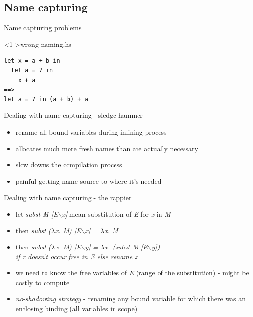 \documentclass[hyperref={pdfpagelabels=false},xcolor={dvipsnames},compress,table,usenames,dvipsnames]{beamer}
\begin{document}
    \subsection{Name capturing}

    \begin{frame}[fragile]{Name capturing problems}
        \begin{exampleblock}
            <1->{wrong-naming.hs}
            \begin{lstlisting}
let x = a + b in
  let a = 7 in
    x + a
==>
let a = 7 in (a + b) + a
            \end{lstlisting}
        \end{exampleblock}
    \end{frame}

    \begin{frame}[fragile]{Dealing with name capturing - sledge hammer}
        \begin{itemize}
            \item rename all bound variables during inlining process\pause
            \item allocates much more fresh names than are actually necessary\pause
            \item slow downs the compilation process\pause
            \item painful getting name source to where it's needed
        \end{itemize}
    \end{frame}

    \begin{frame}[fragile]{Dealing with name capturing - the rappier}
        \begin{itemize}
            \item let \textit{subst M [E$\backslash$x]} mean substitution of \textit{E} for \textit{x} in \textit{M}\pause
            \item then \textit{subst ($\lambda$x. M) [E$\backslash$x] = $\lambda$x. M}\pause
            \item then \textit{subst ($\lambda$x. M) [E$\backslash$y] = $\lambda$x. (subst M [E$\backslash$y])\\if x doesn't occur free in E else rename x}\pause
            \item we need to know the free variables of \textit{E} (range of the substitution) - might be costly to compute\pause
            \item \textit{no-shadowing strategy} - renaming any bound variable for which there was an enclosing binding (all variables in scope)
        \end{itemize}
    \end{frame}
\end{document}
